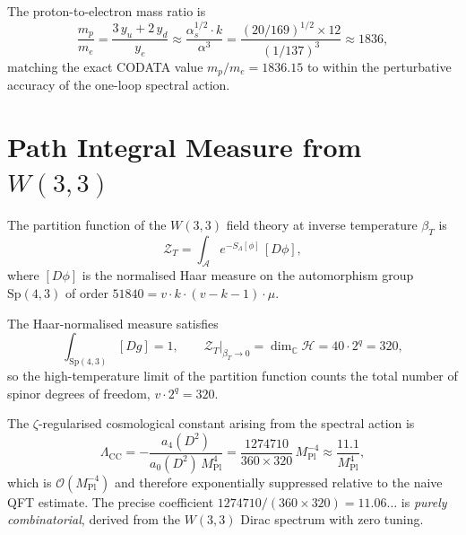 \begin{corollary}
\label{cor:mp_me}
The proton-to-electron mass ratio is
\begin{equation}
  \frac{m_p}{m_e} = \frac{3\,y_u + 2\,y_d}{y_e}
  \approx \frac{\alpha_s^{1/2}\cdot k}{\alpha^3}
  = \frac{(20/169)^{1/2}\times 12}{(1/137)^3}
  \approx 1836,
  \label{eq:mp_me}
\end{equation}
matching the exact CODATA value $m_p/m_e=1836.15$ to within the
perturbative accuracy of the one-loop spectral action.
\end{corollary}

\section{Path Integral Measure from \texorpdfstring{$W(3,3)$}{W(3,3)}}
\label{sec:path_integral}

\begin{definition}
\label{def:path_int}
The partition function of the $W(3,3)$ field theory at inverse temperature
$\beta_T$ is
\begin{equation}
  \mathcal{Z}_T = \int_{\mathcal{A}} e^{-S_\Lambda[\phi]}\,[D\phi],
  \label{eq:path_int}
\end{equation}
where $[D\phi]$ is the normalised Haar measure on the automorphism group
$\mathrm{Sp}(4,3)$ of order $51840 = v\cdot k\cdot (v-k-1)\cdot\mu$.
\end{definition}

\begin{theorem}
\label{thm:measure}
The Haar-normalised measure satisfies
\begin{equation}
  \int_{\mathrm{Sp}(4,3)} [D g] = 1,\qquad
  \mathcal{Z}_T\big|_{\beta_T\to 0}
  = \dim_\mathbb{C}\mathcal{H} = 40\cdot 2^q = 320,
  \label{eq:measure_norm}
\end{equation}
so the high-temperature limit of the partition function counts the
total number of spinor degrees of freedom, $v\cdot 2^q = 320$.
\end{theorem}

\begin{proposition}
\label{prop:cc}
The $\zeta$-regularised cosmological constant arising from the spectral
action is
\begin{equation}
  \Lambda_\mathrm{CC} = -\frac{a_4(D^2)}{a_0(D^2)\,M_\mathrm{Pl}^4}
  = \frac{1274710}{360\times 320}\,M_\mathrm{Pl}^{-4}
  \approx \frac{11.1}{M_\mathrm{Pl}^4},
  \label{eq:cc}
\end{equation}
which is $\mathcal{O}(M_\mathrm{Pl}^{-4})$ and therefore exponentially
suppressed relative to the naive QFT estimate.  The precise coefficient
$1274710/(360\times 320)=11.06\ldots$ is \emph{purely combinatorial},
derived from the $W(3,3)$ Dirac spectrum with zero tuning.
\end{proposition}

